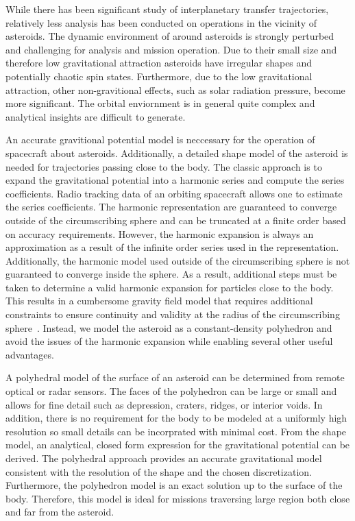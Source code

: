 \documentclass[]{aiaa-tc}%
\begin{document}
While there has been significant study of interplanetary transfer trajectories, relatively less analysis has been conducted on operations in the vicinity of asteroids.
The dynamic environment of around asteroids is strongly perturbed and challenging for analysis and mission operation.
Due to their small size and therefore low gravitational attraction asteroids have irregular shapes and potentially chaotic spin states.
Furthermore, due to the low gravitational attraction, other non-gravitional effects, such as solar radiation pressure, become more significant.
The orbital enviornment is in general quite complex and analytical insights are difficult to generate.

An accurate gravitional potential model is neccessary for the operation of spacecraft about asteroids.
Additionally, a detailed shape model of the asteroid is needed for trajectories passing close to the body.
The classic approach is to expand the gravitational potential into a harmonic series and compute the series coefficients.
Radio tracking data of an orbiting spacecraft allows one to estimate the series coefficients.
The harmonic representation are guaranteed to converge outside of the circumscribing sphere and can be truncated at a finite order based on accuracy requirements.
However, the harmonic expansion is always an approximation as a result of the infinite order series used in the representation.
Additionally, the harmonic model used outside of the circumscribing sphere is not guaranteed to converge inside the sphere.
As a result, additional steps must be taken to determine a valid harmonic expansion for particles close to the body.
This results in a cumbersome gravity field model that requires additional constraints to ensure continuity and validity at the radius of the circumscribing sphere~\cite{werner1996}.
Instead, we model the asteroid as a constant-density polyhedron and avoid the issues of the harmonic expansion while enabling several other useful advantages.

A polyhedral model of the surface of an asteroid can be determined from remote optical or radar sensors.
The faces of the polyhedron can be large or small and allows for fine detail such as depression, craters, ridges, or interior voids.
In addition, there is no requirement for the body to be modeled at a uniformly high resolution so small details can be incorprated with minimal cost.
From the shape model, an analytical, closed form expression for the gravitational potential can be derived.
The polyhedral approach provides an accurate gravitational model consistent with the resolution of the shape and the chosen discretization.
Furthermore, the polyhedron model is an exact solution up to the surface of the body.
Therefore, this model is ideal for missions traversing large region both close and far from the asteroid.
\end{document}
